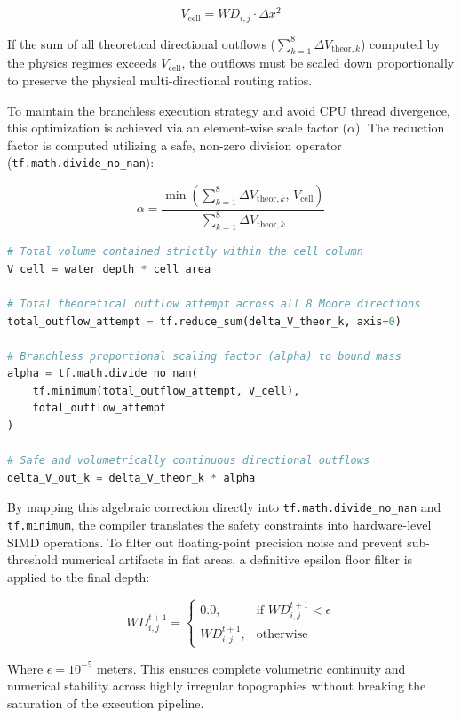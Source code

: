 $$V_{\text{cell}} = WD_{i,j} \cdot \Delta x^2$$

If the sum of all theoretical directional outflows ($\sum_{k=1}^{8} \Delta V_{\text{theor}, k}$) computed by the physics regimes exceeds 
$V_{\text{cell}}$, the outflows must be scaled down proportionally to preserve the physical multi-directional routing ratios. 

To maintain the branchless execution strategy and avoid CPU thread divergence, this optimization is achieved via an element-wise scale 
factor ($\alpha$). The reduction factor is computed utilizing a safe, non-zero division operator (\texttt{tf.math.divide\_no\_nan}):

$$\alpha = \frac{\min\left(\sum_{k=1}^{8} \Delta V_{\text{theor}, k},\, V_{\text{cell}}\right)}{\sum_{k=1}^{8} \Delta V_{\text{theor}, k}}$$

\begin{lstlisting}[language=Python, caption=Tensorized Volumetric Shields and Safe Scaling]
# Total volume contained strictly within the cell column
V_cell = water_depth * cell_area

# Total theoretical outflow attempt across all 8 Moore directions
total_outflow_attempt = tf.reduce_sum(delta_V_theor_k, axis=0)

# Branchless proportional scaling factor (alpha) to bound mass
alpha = tf.math.divide_no_nan(
    tf.minimum(total_outflow_attempt, V_cell), 
    total_outflow_attempt
)

# Safe and volumetrically continuous directional outflows
delta_V_out_k = delta_V_theor_k * alpha
\end{lstlisting}

By mapping this algebraic correction directly into \texttt{tf.math.divide\_no\_nan} and \texttt{tf.minimum}, the compiler translates the 
safety constraints into hardware-level SIMD operations. To filter out floating-point precision noise and prevent sub-threshold numerical 
artifacts in flat areas, a definitive epsilon floor filter is applied to the final depth:

$$WD_{i,j}^{t+1} = \begin{cases} 
0.0, & \text{if } WD_{i,j}^{t+1} < \epsilon \\ 
WD_{i,j}^{t+1}, & \text{otherwise} 
\end{cases}$$

Where $\epsilon = 10^{-5}$ meters. This ensures complete volumetric continuity and numerical stability across highly irregular topographies 
without breaking the saturation of the execution pipeline.

